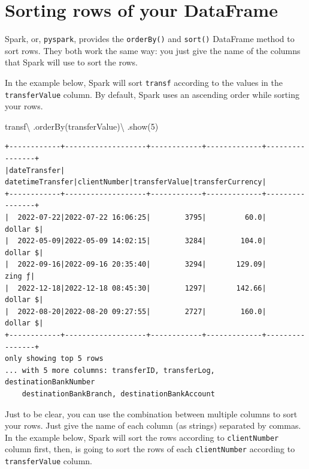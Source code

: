\documentclass[
  11pt,
  letterpaper,
  DIV=11,
  numbers=noendperiod]{scrreprt}
\newenvironment{Shaded}{\begin{snugshade}}{\end{snugshade}}
\newcommand{\DecValTok}[1]{\textcolor[rgb]{0.68,0.00,0.00}{#1}}
\newcommand{\NormalTok}[1]{\textcolor[rgb]{0.00,0.23,0.31}{#1}}
\newcommand{\OperatorTok}[1]{\textcolor[rgb]{0.37,0.37,0.37}{#1}}
\newcommand{\StringTok}[1]{\textcolor[rgb]{0.13,0.47,0.30}{#1}}
\begin{document}
\hypertarget{sorting-rows-of-your-dataframe}{%
\section{Sorting rows of your
DataFrame}\label{sorting-rows-of-your-dataframe}}

Spark, or, \texttt{pyspark}, provides the \texttt{orderBy()} and
\texttt{sort()} DataFrame method to sort rows. They both work the same
way: you just give the name of the columns that Spark will use to sort
the rows.

In the example below, Spark will sort \texttt{transf} according to the
values in the \texttt{transferValue} column. By default, Spark uses an
ascending order while sorting your rows.

\begin{Shaded}
\begin{Highlighting}[]
\NormalTok{transf}\OperatorTok{\textbackslash{}}
\NormalTok{  .orderBy(}\StringTok{\textquotesingle{}transferValue\textquotesingle{}}\NormalTok{)}\OperatorTok{\textbackslash{}}
\NormalTok{  .show(}\DecValTok{5}\NormalTok{)}
\end{Highlighting}
\end{Shaded}

\begin{verbatim}
+------------+-------------------+------------+-------------+----------------+
|dateTransfer|   datetimeTransfer|clientNumber|transferValue|transferCurrency|
+------------+-------------------+------------+-------------+----------------+
|  2022-07-22|2022-07-22 16:06:25|        3795|         60.0|        dollar $|
|  2022-05-09|2022-05-09 14:02:15|        3284|        104.0|        dollar $|
|  2022-09-16|2022-09-16 20:35:40|        3294|       129.09|          zing ƒ|
|  2022-12-18|2022-12-18 08:45:30|        1297|       142.66|        dollar $|
|  2022-08-20|2022-08-20 09:27:55|        2727|        160.0|        dollar $|
+------------+-------------------+------------+-------------+----------------+
only showing top 5 rows
... with 5 more columns: transferID, transferLog, destinationBankNumber
    destinationBankBranch, destinationBankAccount
\end{verbatim}

Just to be clear, you can use the combination between multiple columns
to sort your rows. Just give the name of each column (as strings)
separated by commas. In the example below, Spark will sort the rows
according to \texttt{clientNumber} column first, then, is going to sort
the rows of each \texttt{clientNumber} according to
\texttt{transferValue} column.
\end{document}

